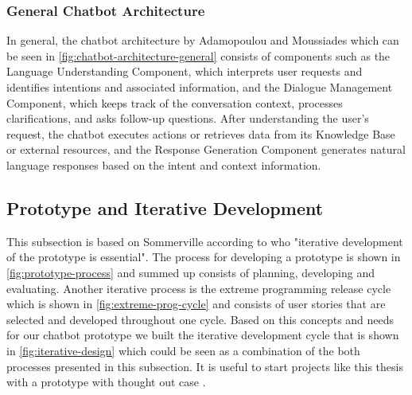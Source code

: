 \subsubsection{General Chatbot Architecture}
In general, the chatbot architecture by Adamopoulou and Moussiades\cite{adamopoulou_overview_2020} which can be seen in \cref{fig:chatbot-architecture-general} consists of components such as the Language Understanding Component, which interprets user requests and identifies intentions and associated information, and the Dialogue Management Component, which keeps track of the conversation context, processes clarifications, and asks follow-up questions. After understanding the user's request, the chatbot executes actions or retrieves data from its Knowledge Base or external resources, and the Response Generation Component generates natural language responses based on the intent and context information.

\subsection*{Prototype and Iterative Development}

This subsection is based on Sommerville \cite{sommerville_software_2011} according to who "iterative development of the prototype is essential".
The process for developing a prototype is shown in \cref{fig:prototype-process} and summed up consists of planning, developing and evaluating.
Another iterative process is the extreme programming release cycle which is shown in \cref{fig:extreme-prog-cycle} and consists of user stories that are selected and developed throughout one cycle.
Based on this concepts and needs for our chatbot prototype we built the iterative development cycle that is shown in \cref{fig:iterative-design} which could be seen as a combination of the both processes presented in this subsection.
It is useful to start projects like this thesis with a prototype with thought out case \cite{lehmann_chatbot-guide_2021}.


